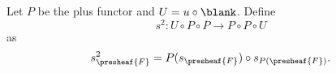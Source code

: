 \begin{definition}
Let $P$ be the plus functor and $U = u \circ \blank$.
Define 
\[s^2: U \circ P\circ P \rightarrow P \circ P \circ U\]
as
\[s^2_{\presheaf{F}} = P(s_{\presheaf{F}}) \circ s_{P(\presheaf{F})}.\]
\end{definition}